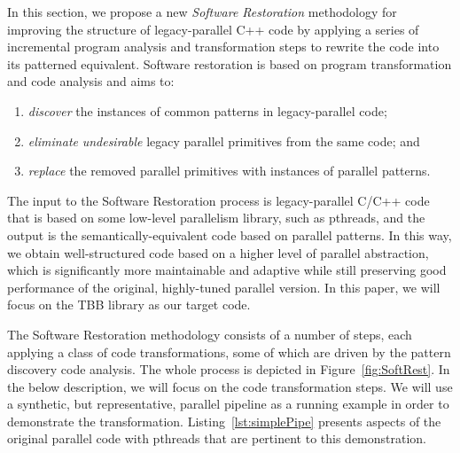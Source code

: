 \noindent
In this section, we propose a new \emph{Software Restoration} methodology %
for improving the structure of legacy-parallel C++ code by applying a series of incremental program analysis and transformation steps to rewrite the code into its patterned equivalent. %
Software restoration is based on program transformation and code analysis and aims to:
\begin{enumerate}
\item \emph{discover} the instances of common patterns in legacy-parallel code;
\item \emph{eliminate} \emph{undesirable} legacy parallel primitives from the same code; and
\item \emph{replace} the removed parallel primitives with instances of parallel patterns.
\end{enumerate}
\noindent
The input to the Software Restoration process is legacy-parallel C/C++ code that is based on some low-level parallelism library, such as pthreads, and the output is the semantically-equivalent code based on parallel patterns. In this way, we obtain well-structured code based on a higher level of parallel abstraction, which is significantly more maintainable and adaptive while still preserving
good performance of the original, highly-tuned parallel version. In this paper, we will focus on the TBB library as our target code. 

The Software Restoration methodology consists of a number of steps, each applying a class of code transformations, some of which are driven by the pattern discovery code analysis.  The whole process is depicted in Figure~\ref{fig:SoftRest}. In the below description, we will focus on the code transformation steps. We will use a synthetic, but representative, parallel pipeline as a running example in order to demonstrate the transformation. Listing~\ref{lst:simplePipe} presents aspects of the original parallel code with pthreads that are pertinent to this demonstration.

